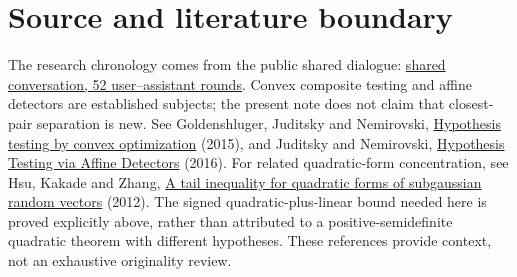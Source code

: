 \documentclass[11pt]{article}
\theoremstyle{remark}\newtheorem{remark}[theorem]{Remark}
\begin{document}
\section*{Source and literature boundary}
The research chronology comes from the public shared dialogue:
\href{https://chatgpt.com/share/6ac5b054-cb1c-83ea-b356-82b799adea48}{shared conversation, 52 user--assistant rounds}.
Convex composite testing and affine detectors are established subjects; the present note does not claim that closest-pair separation is new. See Goldenshluger, Juditsky and Nemirovski,
\href{https://arxiv.org/abs/1311.6765}{Hypothesis testing by convex optimization} (2015), and Juditsky and Nemirovski,
\href{https://arxiv.org/abs/1604.02576}{Hypothesis Testing via Affine Detectors} (2016).
For related quadratic-form concentration, see Hsu, Kakade and Zhang,
\href{https://arxiv.org/abs/1110.2842}{A tail inequality for quadratic forms of subgaussian random vectors} (2012).
The signed quadratic-plus-linear bound needed here is proved explicitly above, rather than attributed to a positive-semidefinite quadratic theorem with different hypotheses. These references provide context, not an exhaustive originality review.
\end{document}
